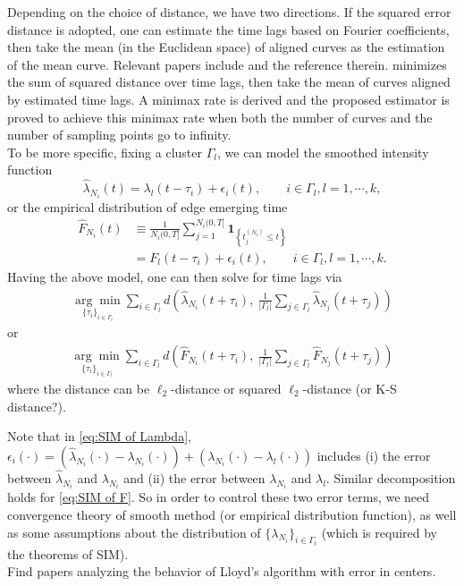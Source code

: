			Depending on the choice of distance, we have two directions.
			If the squared error distance is adopted, one can estimate the time lags based on Fourier coefficients, then take the mean (in the Euclidean space) of aligned curves as the estimation of the mean curve. 
			Relevant papers include \cite{Bigot2013,JeremieBigot2010} and the reference therein.
			\citet{Bigot2013} minimizes the sum of squared distance over time lags, then take the mean of curves aligned by estimated time lags. A minimax rate is derived and the proposed estimator is proved to achieve this minimax rate when both the number of curves and the number of sampling points go to infinity.
			\\
			To be more specific, fixing a cluster $\Gamma_l$, we can model the smoothed intensity function 
				\begin{equation}\label{eq:SIM of Lambda}
				\hat\lambda_{N_i}(t) = \lambda_l(t-\tau_i)+\epsilon_i(t), \qquad i\in\Gamma_l, l=1,\cdots,k,
				\end{equation}
			or the empirical distribution of edge emerging time
				\begin{align}\label{eq:SIM of F}
				\hat F_{N_i}(t) &\equiv \frac{1}{N_i(0,T]}\sum_{j=1}^{N_i(0,T]}\mathbf{1}_{\left\{ t_j^{(N_i)}\leq t \right\}}\nonumber\\
				&= F_l(t-\tau_i)+\epsilon_i(t), \qquad i\in\Gamma_l, l=1,\cdots,k.
				\end{align}
			Having the above model, one can then solve for time lags via
				\begin{align*}
				\underset{\{\tau_i\}_{i\in \Gamma_l}}{\arg\min}\sum_{i\in\Gamma_l}d\left(\hat\lambda_{N_i}(t+\tau_i),~ \frac{1}{|\Gamma_l|}\sum_{j\in\Gamma_l}\hat\lambda_{N_j}(t+\tau_j)\right)
				\end{align*}
				or
				\begin{align*}
				\underset{\{\tau_i\}_{i\in \Gamma_l}}{\arg\min}\sum_{i\in\Gamma_l}d\left(\hat F_{N_i}(t+\tau_i),~ \frac{1}{|\Gamma_l|}\sum_{j\in\Gamma_l}\hat F_{N_j}(t+\tau_j)\right)
				\end{align*}
			where the distance can be $\ell_2$-distance or squared $\ell_2$-distance (or K-S distance?).
			
			Note that in \eqref{eq:SIM of Lambda}, 
			$\epsilon_i(\cdot) = (\hat\lambda_{N_i}(\cdot)-\lambda_{N_i}(\cdot))+(\lambda_{N_i}(\cdot)-\lambda_{l}(\cdot)) $ includes 
			(i) the error between $\hat\lambda_{N_i}$ and $\lambda_{N_i}$ and 
			(ii) the error between $\lambda_{N_i}$ and $\lambda_l$. 
			Similar decomposition holds for \eqref{eq:SIM of F}.
			{\color{red} So in order to control these two error terms,
			we need convergence theory of smooth method (or empirical distribution function), as well as some assumptions about the distribution of $\{\lambda_{N_i}\}_{i\in\Gamma_l}$ (which is required by the theorems of SIM). }\\
			{\color{blue} Find papers analyzing the behavior of Lloyd's algorithm with error in centers.}

